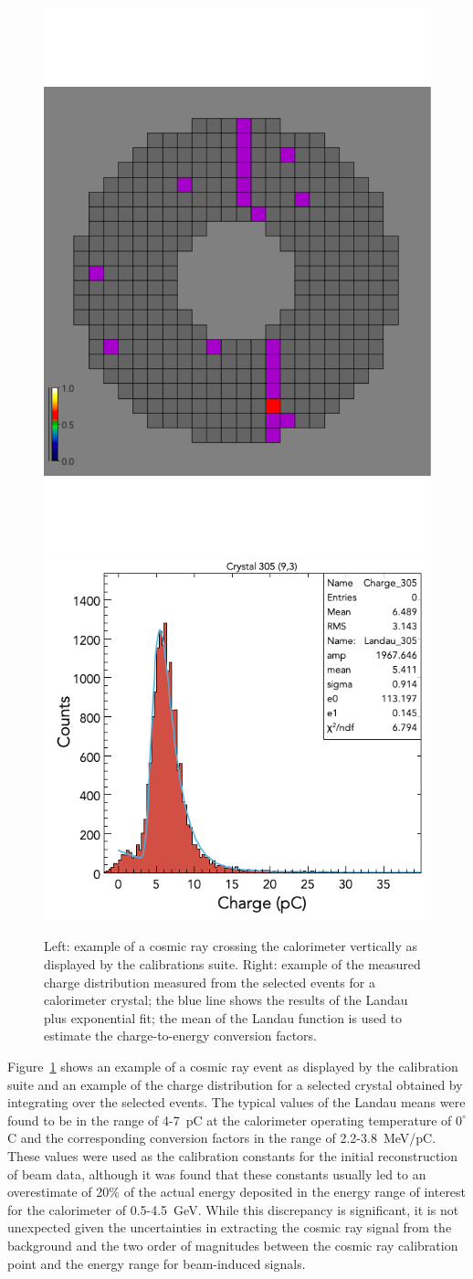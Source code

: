 \begin{figure}
\includegraphics[height=0.58\columnwidth]{fig/ftcal_cosmicview.pdf}
\includegraphics[height=0.5\columnwidth]{fig/ftcal_cosmiccharge.png}
\caption{Left: example of a cosmic ray crossing the calorimeter vertically as displayed by the calibrations suite.
  Right: example of the measured charge distribution measured from the selected events for a calorimeter crystal;
  the blue line shows the results of the Landau plus exponential fit; the mean of the Landau function is used to
  estimate the charge-to-energy conversion factors.}
\label{fig:ftcal_cosmic}
\end{figure}

Figure~\ref{fig:ftcal_cosmic} shows an example of a cosmic ray event as displayed by the calibration suite and an
example of the charge distribution for a selected crystal obtained by integrating over the selected events. The
typical values of the Landau means were found to be in the range of 4-7~pC at the calorimeter operating temperature
of $0^\circ$C and the corresponding conversion factors in the range of 2.2-3.8~MeV/pC. These values were used as
the calibration constants for the initial reconstruction of beam data, although it was found that these constants
usually led to an overestimate of 20\% of the actual energy deposited in the energy range of interest for the
calorimeter of 0.5-4.5~GeV. While this discrepancy is significant, it is not unexpected given the uncertainties in
extracting the cosmic ray signal from the background and the two order of magnitudes between the cosmic ray
calibration point and the energy range for beam-induced signals.

